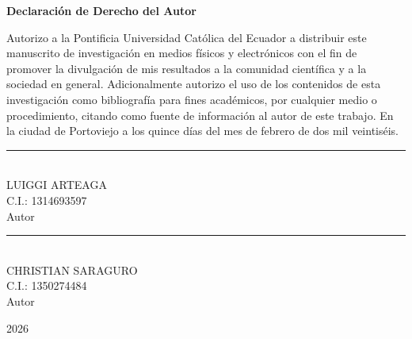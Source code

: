 
\clearpage
    \thispagestyle{plain}

    \begin{center}
        \vspace*{1.7cm}
        \textbf{Declaración de Derecho del Autor}

        \vspace{0.8cm}
        \raggedright
        

        Autorizo a la Pontificia Universidad Católica del Ecuador a distribuir este manuscrito de investigación en medios físicos y electrónicos con el fin de promover la divulgación de mis resultados a la comunidad científica y a la sociedad en general. Adicionalmente autorizo el uso de los contenidos de esta investigación como bibliografía para fines académicos, por cualquier medio o procedimiento, citando como fuente de información al autor de este trabajo.
        En la ciudad de Portoviejo a los quince días del mes de febrero de dos mil veintiséis.
             \par
\vspace{3.0cm}
\centering

\begin{minipage}{0.45\textwidth}
    \centering
    \rule{7cm}{0.4pt} \\ 
    LUIGGI ARTEAGA \\
    C.I.: 1314693597 \\
    Autor
\end{minipage}
\hfill
\begin{minipage}{0.45\textwidth}
    \centering
    \rule{7cm}{0.4pt} \\ 
    CHRISTIAN SARAGURO \\
    C.I.: 1350274484 \\
    Autor
\end{minipage}
        

        \vspace{5.0cm}

        2026
    \end{center}
\clearpage

